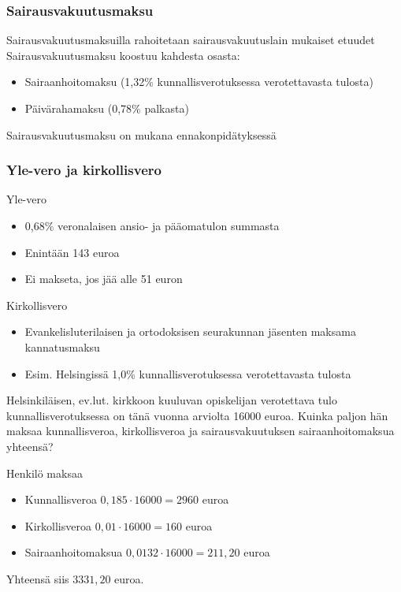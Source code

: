 \documentclass[]{beamer}\usepackage[]{graphicx}\usepackage[]{color}
\newcommand{\pblock}{\\ \vspace{0.5cm}\pause}
\begin{document}
\begin{frame}
\frametitle{Sairausvakuutusmaksu}
\pause
Sairausvakuutusmaksuilla rahoitetaan sairausvakuutuslain mukaiset etuudet 
\pblock
Sairausvakuutusmaksu koostuu kahdesta osasta:
\begin{itemize}
	\item Sairaanhoitomaksu (1,32\%	kunnallisverotuksessa verotettavasta tulosta)
	\item Päivärahamaksu (0,78\% palkasta)
	\pblock
\end{itemize}
Sairausvakuutusmaksu on mukana ennakonpidätyksessä
\end{frame}

\begin{frame}
\frametitle{Yle-vero ja kirkollisvero}
\begin{block}{Yle-vero}
	\begin{itemize}
		\item 0,68\% veronalaisen ansio- ja pääomatulon summasta
		\item Enintään 143 euroa
		\item Ei makseta, jos jää alle 51 euron
	\end{itemize}
\end{block}
\pause
\begin{block}{Kirkollisvero}
	\begin{itemize}
		\item Evankelisluterilaisen ja ortodoksisen seurakunnan jäsenten maksama kannatusmaksu
		\item Esim. Helsingissä 1,0\% kunnallisverotuksessa verotettavasta tulosta
	\end{itemize}
\end{block}
\end{frame}

\begin{frame}
	\begin{esim}
		Helsinkiläisen, ev.lut. kirkkoon kuuluvan opiskelijan verotettava tulo kunnallisverotuksessa on tänä vuonna arviolta 16000 euroa. Kuinka paljon hän maksaa kunnallisveroa, kirkollisveroa ja sairausvakuutuksen sairaanhoitomaksua yhteensä?
	\end{esim}
	\begin{ratkaisu}
		Henkilö maksaa
		\begin{itemize}
			\item Kunnallisveroa \pause \(0,185\cdot16000 = 2960\) euroa \pause
			\item Kirkollisveroa \pause \(0,01\cdot 16000 = 160\) euroa\pause
			\item Sairaanhoitomaksua \pause \(0,0132\cdot 16000 = 211,20\) euroa
		\end{itemize}
		\pause Yhteensä siis \(3331,20\) euroa.
	\end{ratkaisu}
\end{frame}
\end{document}

